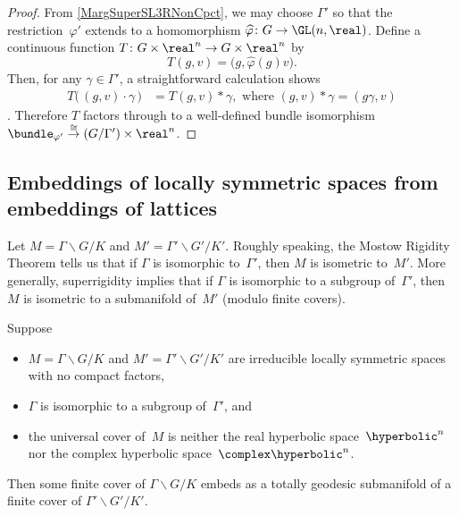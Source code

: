\begin{proof}
From \cref{MargSuperSL3RNonCpct}, we may choose $\Gamma'$ so that the restriction~$\varphi'$ extends to a homomorphism $\widehat\varphi \colon G \to \GL(n,\real)$. Define a continuous function $T \colon G \times \real^n \to G \times \real^n$ by
	$$ T(g,v) = \bigl( g, \widehat\varphi(g) v \bigr) .$$
Then, for any $\gamma \in \Gamma'$, a straightforward calculation shows
	\begin{align} \label{FlatBundleTequi}
	 T \bigl(\, (g,v) \cdot \gamma \, \bigr) 
	 &= T(g,v) * \gamma
	 , \text{ where $(g,v) * \gamma = (g \gamma, v)$}
	 \end{align}
.
Therefore $T$ factors through to a well-defined bundle isomorphism $\bundle_{\varphi'} \stackrel{\cong}{\to} (G/\Gamma') \times \real^n$.
\end{proof}



 
\subsection{Embeddings of locally symmetric spaces from embeddings of lattices} \label{TotGeodSect}

Let $M = \Gamma \backslash G / K$ and $M' = \Gamma ' \backslash G' \! / K'$.
Roughly speaking, the Mostow Rigidity Theorem  tells us that if $\Gamma$ is isomorphic to~$\Gamma'$, then $M$ is isometric to~$M'$.  More generally, superrigidity implies that if $\Gamma$ is isomorphic to a subgroup of~$\Gamma'$, then $M$ is isometric to a submanifold of~$M'$ (modulo finite covers).

\begin{prop} \label{TotGeodProp}
Suppose 
	\begin{itemize}
	\item $M = \Gamma \backslash G / K$ and $M' = \Gamma ' \backslash G' \! / K'$ are irreducible locally symmetric spaces with no compact factors,
	\item $\Gamma$ is isomorphic to a subgroup of\/~$\Gamma'$,
	and
	\item the universal cover of~$M$ is neither the real hyperbolic space~$\hyperbolic^n$ nor the complex hyperbolic space~$\complex\hyperbolic^n$.
	\end{itemize}
Then some finite cover of\/ $\Gamma \backslash G / K$ embeds as a totally geodesic submanifold of a finite cover of\/ $\Gamma' \backslash G' \! / K'$.
\end{prop}

